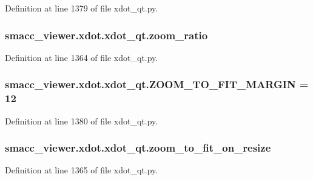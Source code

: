 Definition at line 1379 of file xdot\+\_\+qt.\+py.

\subsubsection[{\texorpdfstring{zoom\+\_\+ratio}{zoom_ratio}}]{\setlength{\rightskip}{0pt plus 5cm}smacc\+\_\+viewer.\+xdot.\+xdot\+\_\+qt.\+zoom\+\_\+ratio}\hypertarget{namespacesmacc__viewer_1_1xdot_1_1xdot__qt_ab0b18c2a0f7367089860915decf159a1}{}\label{namespacesmacc__viewer_1_1xdot_1_1xdot__qt_ab0b18c2a0f7367089860915decf159a1}


Definition at line 1364 of file xdot\+\_\+qt.\+py.

\subsubsection[{\texorpdfstring{Z\+O\+O\+M\+\_\+\+T\+O\+\_\+\+F\+I\+T\+\_\+\+M\+A\+R\+G\+IN}{ZOOM_TO_FIT_MARGIN}}]{ smacc\+\_\+viewer.\+xdot.\+xdot\+\_\+qt.\+Z\+O\+O\+M\+\_\+\+T\+O\+\_\+\+F\+I\+T\+\_\+\+M\+A\+R\+G\+IN = 12}\hypertarget{namespacesmacc__viewer_1_1xdot_1_1xdot__qt_aff361a5ddb95dd45c48edb5224f6f218}{}\label{namespacesmacc__viewer_1_1xdot_1_1xdot__qt_aff361a5ddb95dd45c48edb5224f6f218}


Definition at line 1380 of file xdot\+\_\+qt.\+py.

\subsubsection[{\texorpdfstring{zoom\+\_\+to\+\_\+fit\+\_\+on\+\_\+resize}{zoom_to_fit_on_resize}}]{\setlength{\rightskip}{0pt plus 5cm}smacc\+\_\+viewer.\+xdot.\+xdot\+\_\+qt.\+zoom\+\_\+to\+\_\+fit\+\_\+on\+\_\+resize}\hypertarget{namespacesmacc__viewer_1_1xdot_1_1xdot__qt_a8e9a2b5bda1c0aa66d24db77d9de1b9c}{}\label{namespacesmacc__viewer_1_1xdot_1_1xdot__qt_a8e9a2b5bda1c0aa66d24db77d9de1b9c}


Definition at line 1365 of file xdot\+\_\+qt.\+py.

